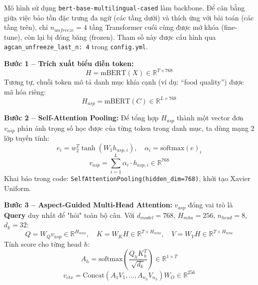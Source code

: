 \documentclass[12pt,a4paper,oneside]{report}
\begin{document}
Mô hình sử dụng \texttt{bert-base-multilingual-cased} làm backbone. Để cân bằng giữa việc bảo tồn đặc trưng đa ngữ (các tầng dưới) và thích ứng với bài toán (các tầng trên), chỉ $n_{unfreeze} = 4$ tầng Transformer cuối cùng được mở khóa (fine-tune), còn lại bị đóng băng (frozen). Tham số này được cấu hình qua \texttt{agcan\_unfreeze\_last\_n: 4} trong \texttt{config.yml}.

\textbf{Bước 1 -- Trích xuất biểu diễn token:}
\begin{equation}
    H = \text{mBERT}(X) \in \mathbb{R}^{T \times 768}
\end{equation}
Tương tự, chuỗi token mô tả danh mục khía cạnh (ví dụ: ``food quality'') được mã hóa riêng:
\begin{equation}
    H_{asp} = \text{mBERT}(C) \in \mathbb{R}^{L \times 768}
\end{equation}

\textbf{Bước 2 -- Self-Attention Pooling:}
Để tổng hợp $H_{asp}$ thành một vector đơn $v_{asp}$ phản ánh trọng số học được của từng token trong danh mục, ta dùng mạng 2 lớp tuyến tính:
\begin{equation}
    e_i = w_2^T \tanh(W_1 h_{asp,i}), \quad \alpha_i = \text{softmax}(e)_i
\end{equation}
\begin{equation}
    v_{asp} = \sum_{i=1}^{L} \alpha_i \cdot h_{asp,i} \in \mathbb{R}^{768}
\end{equation}
Khai báo trong code: \texttt{SelfAttentionPooling(hidden\_dim=768)}, khởi tạo Xavier Uniform.

\textbf{Bước 3 -- Aspect-Guided Multi-Head Attention:}
$v_{asp}$ đóng vai trò là \textbf{Query} duy nhất để "hỏi" toàn bộ câu. Với $d_{model} = 768$, $H_{mha} = 256$, $n_{head} = 8$, $d_k = 32$:
\begin{equation}
    Q = W_Q v_{asp} \in \mathbb{R}^{H_{mha}}, \quad K = W_K H \in \mathbb{R}^{T \times H_{mha}}, \quad V = W_V H \in \mathbb{R}^{T \times H_{mha}}
\end{equation}
Tính score cho từng head $h$:
\begin{equation}
    A_h = \text{softmax}\!\left(\frac{Q_h K_h^T}{\sqrt{d_k}}\right) \in \mathbb{R}^{1 \times T}
\end{equation}
\begin{equation}
    v_{ctx} = \text{Concat}(A_1 V_1, \dots, A_{n_h} V_{n_h}) W_O \in \mathbb{R}^{256}
\end{equation}
\end{document}
